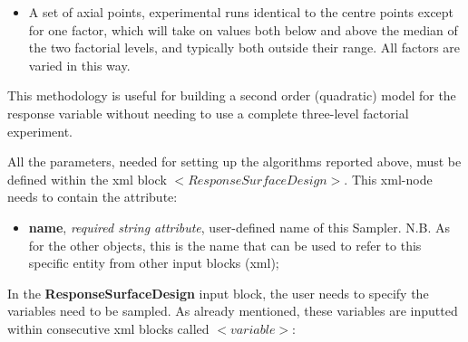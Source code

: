 \begin{itemize}
\begin{itemize}
\item A set of axial points, experimental runs identical to the centre points except for one factor, which will take on values both below and above the median of the two factorial levels, and typically both outside their range. All factors are varied in this way.
\end{itemize}
This methodology is useful for building a second order (quadratic) model for the response variable without needing to use a complete three-level factorial experiment.
\end{itemize}
All the parameters, needed for setting up the algorithms reported above, must be defined within the xml block $<ResponseSurfaceDesign>$. This xml-node needs to contain the attribute:
\begin{itemize}
\itemsep0em
\item \textbf{name}, \textit{required string attribute}, user-defined name of this Sampler. N.B. As for the other objects, this is the name that can be used to refer to this specific entity from other input blocks (xml);
\end{itemize}
In the \textbf{ResponseSurfaceDesign} input block, the user needs to specify the variables need to be sampled. As already mentioned, these variables are inputted within consecutive xml blocks called $<variable>$:
